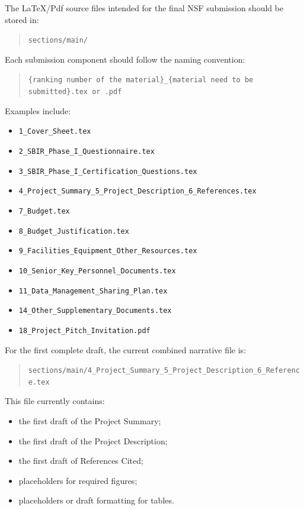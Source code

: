 \documentclass[11pt,letterpaper]{article}
\begin{document}
The LaTeX/Pdf source files intended for the final NSF submission should be stored
in:

\begin{quote}
\texttt{sections/main/}
\end{quote}

Each submission component should follow the naming convention:

\begin{quote}
\texttt{\{ranking number of the material\}\_\{material need to be submitted\}.tex or .pdf}
\end{quote}

Examples include:

\begin{itemize}[leftmargin=0.25in]
    \item \texttt{1\_Cover\_Sheet.tex}
    \item \texttt{2\_SBIR\_Phase\_I\_Questionnaire.tex}
    \item \texttt{3\_SBIR\_Phase\_I\_Certification\_Questions.tex}
    \item \texttt{4\_Project\_Summary\_5\_Project\_Description\_6\_References.tex}
    \item \texttt{7\_Budget.tex}
    \item \texttt{8\_Budget\_Justification.tex}
    \item \texttt{9\_Facilities\_Equipment\_Other\_Resources.tex}
    \item \texttt{10\_Senior\_Key\_Personnel\_Documents.tex}
    \item \texttt{11\_Data\_Management\_Sharing\_Plan.tex}
    \item \texttt{14\_Other\_Supplementary\_Documents.tex}
    \item \texttt{18\_Project\_Pitch\_Invitation.pdf}
\end{itemize}

For the first complete draft, the current combined narrative file is:

\begin{quote}
\texttt{sections/main/4\_Project\_Summary\_5\_Project\_Description\_6\_Reference.tex}
\end{quote}

This file currently contains:

\begin{itemize}[leftmargin=0.25in]
    \item the first draft of the Project Summary;
    \item the first draft of the Project Description;
    \item the first draft of References Cited;
    \item placeholders for required figures;
    \item placeholders or draft formatting for tables.
\end{itemize}
\end{document}
